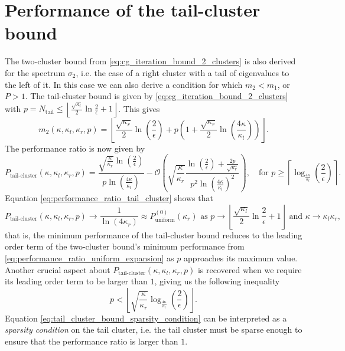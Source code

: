 \section{Performance of the tail-cluster bound}\label{sec:tail_cluster_bound_performance}
The two-cluster bound from \cref{eq:cg_iteration_bound_2_clusters} is also derived for the spectrum $\sigma_2$, i.e. the case of a right cluster with a tail of eigenvalues to the left of it. In this case we can also derive a condition for which $m_2 < m_1$, or $P > 1$. The tail-cluster bound is given by \cref{eq:cg_iteration_bound_2_clusters} with $p = N_{\text{tail}} \leq \left\lfloor\frac{\sqrt{\kappa_l}}{2}\ln{\frac{2}{\epsilon}} + 1 \right\rfloor $. This gives
\[
    m_2(\kappa, \kappa_l, \kappa_r, p) = \left\lfloor
    \frac{\sqrt{\kappa_r}}{2}\ln\left(\frac{2}{\epsilon}\right)
    + p \left(
    1 + \frac{\sqrt{\kappa_r}}{2}\ln\left(\frac{4\kappa}{\kappa_l}\right)
    \right)
    \right\rfloor.
\]
The performance ratio is now given by
\begin{equation}
    P_{\text{tail-cluster}}(\kappa, \kappa_l, \kappa_r, p) = \frac{\sqrt{\frac{\kappa}{\kappa_r}}\ln\left(\frac{2}{\epsilon}\right)}{p\ln\left(\frac{4\kappa}{\kappa_l}\right)} - \mathcal{O}\left(\sqrt{\frac{\kappa}{\kappa_r}}\frac{\ln\left(\frac{2}{\epsilon}\right) + \frac{2p}{\sqrt{\kappa_r}}}{p^2\ln\left(\frac{4\kappa}{\kappa_l}\right)^2}\right), \quad \text{for } p \geq \left\lceil\log_{\frac{4\kappa}{\kappa_l}}\left(\frac{2}{\epsilon}\right)\right\rceil.
    \label{eq:performance_ratio_tail_cluster}
\end{equation}
Equation \ref{eq:performance_ratio_tail_cluster} shows that
\[
    P_{\text{tail-cluster}}(\kappa, \kappa_l, \kappa_r, p) \longrightarrow \frac{1}{\ln(4\kappa_r)} \approx P^{(0)}_{\text{uniform}}(\kappa_r) \text{ as } p \to \left\lfloor\frac{\sqrt{\kappa_l}}{2}\ln{\frac{2}{\epsilon}} + 1 \right\rfloor \text{ and } \kappa \to \kappa_l\kappa_r,
\]
that is, the minimum performance of the tail-cluster bound reduces to the leading order term of the two-cluster bound's minimum performance from \cref{eq:performance_ratio_uniform_expansion} as $p$ approaches its maximum value. Another crucial aspect about $P_{\text{tail-cluster}}(\kappa, \kappa_l, \kappa_r, p)$ is recovered when we require its leading order term to be larger than $1$, giving us the following inequality
\begin{equation}
    p < \left\lfloor\sqrt{\frac{\kappa}{\kappa_r}}\log_{\frac{4\kappa}{\kappa_l}}\left(\frac{2}{\epsilon}\right)\right\rfloor.
    \label{eq:tail_cluster_bound_sparsity_condition}
\end{equation}
Equation \ref{eq:tail_cluster_bound_sparsity_condition} can be interpreted as a \textit{sparsity condition} on the tail cluster, i.e. the tail cluster must be sparse enough to ensure that the performance ratio is larger than $1$.

